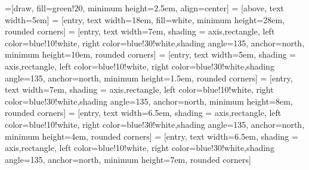 
\usetikzlibrary{calc,positioning}
\usetikzlibrary{arrows.meta}

=[draw, fill=green!20, minimum height=2.5em, align=center]
 = [above, text width=5em]
 = [entry, text width=18em, fill=white, 
minimum height=28em, rounded corners]
 = [entry, text width=7em, shading = axis,rectangle, left color=blue!10!white, right color=blue!30!white,shading angle=135, anchor=north,
minimum height=10em, rounded corners]
 = [entry, text width=5em, shading = axis,rectangle, left color=blue!10!white, right color=blue!30!white,shading angle=135, anchor=north,
minimum height=1.5em, rounded corners]
 = [entry, text width=7em, shading = axis,rectangle, left color=blue!10!white, right color=blue!30!white,shading angle=135, anchor=north,
minimum height=8em, rounded corners]
 = [entry, text width=6.5em, shading = axis,rectangle, left color=blue!10!white, right color=blue!30!white,shading angle=135, anchor=north,
minimum height=4em, rounded corners]
 = [entry, text width=6.5em, shading = axis,rectangle, left color=blue!10!white, right color=blue!30!white,shading angle=135, anchor=north,
minimum height=7em, rounded corners]
\def\blockdist{2.3}
\def\edgedist{2.5}

